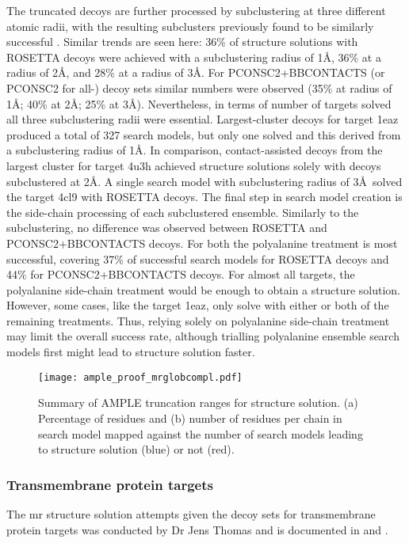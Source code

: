The truncated decoys are further processed by subclustering at three different atomic radii, with the resulting subclusters previously found to be similarly successful \cite{Bibby2012-lm}. Similar trends are seen here: 36\% of structure solutions with ROSETTA decoys were achieved with a subclustering radius of 1\AA, 36\% at a radius of 2\AA, and 28\% at a radius of 3\AA. For PCONSC2+BBCONTACTS (or PCONSC2 for all-\textalpha) decoy sets similar numbers were observed (35\% at radius of 1\AA; 40\% at 2\AA; 25\% at 3\AA). Nevertheless, in terms of number of targets solved all three subclustering radii were essential. Largest-cluster decoys for target 1eaz produced a total of 327 search models, but only one solved and this derived from a subclustering radius of 1\AA. In comparison, contact-assisted decoys from the largest cluster for target 4u3h achieved structure solutions solely with decoys subclustered at 2\AA. A single search model with subclustering radius of 3\AA\ solved the target 4cl9 with ROSETTA decoys. The final step in search model creation is the side-chain processing of each subclustered ensemble. Similarly to the subclustering, no difference was observed between ROSETTA and PCONSC2+BBCONTACTS decoys. For both the polyalanine treatment is most successful, covering 37\% of successful search models for ROSETTA decoys and 44\% for PCONSC2+BBCONTACTS decoys. For almost all targets, the polyalanine side-chain treatment would be enough to obtain a structure solution.  However, some cases, like the target 1eaz, only solve with either or both of the remaining treatments.  Thus, relying solely on polyalanine side-chain treatment may limit the overall success rate, although trialling polyalanine ensemble search models first might lead to structure solution faster.

\begin{figure}[H]
    \centering
    \texttt{[image: ample\_proof\_mrglobcompl.pdf]}
    \caption[Summary of AMPLE truncation ranges for structure solution]{Summary of AMPLE truncation ranges for structure solution. (a) Percentage of residues and (b) number of residues per chain in search model mapped against the number of search models leading to structure solution (blue) or not (red).}
    \label{fig:ample_proof_mrglobcompl}
\end{figure}

\subsubsection{Transmembrane protein targets}
The \gls{mr} structure solution attempts given the decoy sets for transmembrane protein targets was conducted by Dr Jens Thomas and is documented in \textcite{Thomas2017-qu} and \textcite{Thomas2017-sh}.

